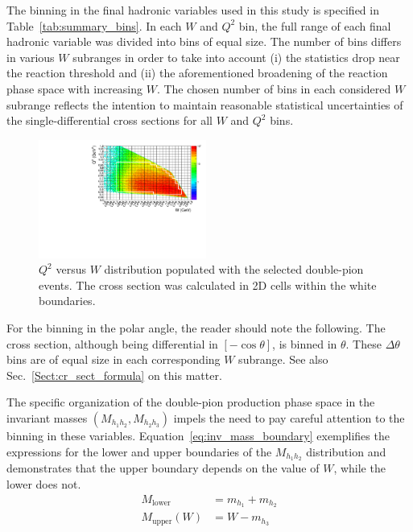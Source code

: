 \documentclass[prc,twocolumn,superscriptaddress,showpacs,amssymb,amsmath,amsfonts,aps,nofootinbib]{revtex4-1}
\begin{document}
The binning in the final hadronic variables used in this study is specified in Table~\ref{tab:summary_bins}. In each $W$ and $Q^{2}$ bin, the full range of each final hadronic variable was divided into bins of equal size. The number of bins differs in various $W$ subranges in order to take into account (i) the statistics drop near the reaction threshold and (ii) the aforementioned broadening of the reaction phase space with increasing $W$. The chosen number of bins in each considered $W$ subrange reflects the intention to maintain reasonable statistical uncertainties of the single-differential cross sections for all $W$ and $Q^2$ bins. 

\begin{figure}[htp]
\begin{center}
\includegraphics[width=0.49\textwidth]{pictures/q2vsw_new2.pdf}
\caption{\small $Q^2$ versus $W$ distribution populated with the selected double-pion events. The cross section was calculated in 2D cells within the white boundaries.} \label{fig:q2_vs_w}
\end{center}
\end{figure}


For the binning in the polar angle, the reader should note the following. The cross section, although being differential in $[-\cos\theta]$, is binned in $\theta$. These $\Delta \theta$ bins are of equal size in each corresponding $W$ subrange. See also Sec.\!~\ref{Sect:cr_sect_formula} on this matter.




The specific organization of the double-pion production phase space in the invariant masses $(M_{h_{1}h_{2}}, M_{h_{2}h_{3}})$ impels the need to pay careful attention to the binning in these variables. Equation~\eqref{eq:inv_mass_boundary} exemplifies the expressions for the lower and upper boundaries of the $M_{h_{1}h_{2}}$ distribution and demonstrates that the upper boundary depends on the value of $W$, while the lower does not.
\begin{equation}
\begin{aligned}
M_{\text{lower}} &= m_{h_1} + m_{h_2} \\
M_{\text{upper}} (W) &= W - m_{h_3} \label{eq:inv_mass_boundary}
\end{aligned}  
\end{equation}
\end{document}
